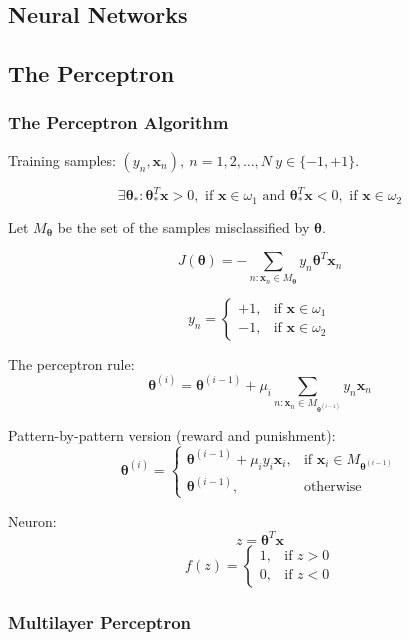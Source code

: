 \documentclass{article}
\begin{document}
\begin{multicols}{2}
\section{Neural Networks}

\subsection{The Perceptron}

\subsubsection*{The Perceptron Algorithm}

Training samples: $(y_n, \symbf{x}_n),\ n=1, 2, \ldots, N\ y \in \{-1, +1\}$.

\[\exists \symbf{\theta}_*: \symbf{\theta}_*^T \symbf{x} > 0,\text{ if }\symbf{x} \in \omega_1\text{ and }\symbf{\theta}_*^T \symbf{x} < 0,\text{ if }\symbf{x} \in \omega_2\]

Let $M_{\symbf{\theta}}$ be the set of the samples misclassified by $\symbf{\theta}$.

\[J(\symbf{\theta}) = - \sum_{n: \symbf{x}_n \in M_{\symbf{\theta}}} y_n \symbf{\theta}^T \symbf{x}_n\]

\[y_n = \begin{cases}
	+1, & \text{if } \symbf{x} \in \omega_1 \\
	-1, & \text{if } \symbf{x} \in \omega_2
\end{cases}\]

The perceptron rule:
\[\symbf{\theta}^{(i)} = \symbf{\theta}^{(i-1)} + \mu_i \sum_{n: \symbf{x}_n \in M_{\symbf{\theta}^{(i-1)}}} y_n \symbf{x}_n\]

Pattern-by-pattern version (reward and punishment):
\[\symbf{\theta}^{(i)} = \begin{cases}
	\symbf{\theta}^{(i-1)} + \mu_i y_i \symbf{x}_i, &\text{if } \symbf{x}_i \in M_{\symbf{\theta}^{(i-1)}} \\
	\symbf{\theta}^{(i-1)}, &\text{otherwise}
\end{cases}\]

Neuron:
\[z = \symbf{\theta}^T \symbf{x}\]
\[f(z) = \begin{cases}
	1, & \text{if } z > 0 \\
	0, & \text{if } z < 0
\end{cases}\]

\subsubsection*{Multilayer Perceptron}


\end{multicols}
\end{document}
